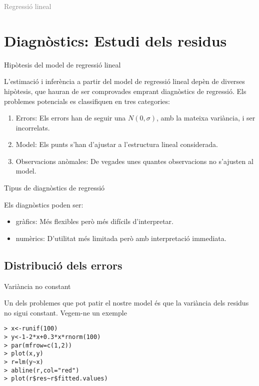 \documentclass[12pt,t]{beamer}
\title[\red{Matemàtiques III}]{}
\author[]{}
\date{}
\newcommand{\gray}[1]{\textcolor{gray}{#1}}
\renewcommand{\emph}[1]{{\color{red}#1}}
\theoremstyle{plain}
\theoremstyle{definition}
\begin{document}
\beamertemplatedotitem

\lstset{breaklines=true}
\lstset{basicstyle=\ttfamily}


\begin{frame}
\vfill
\begin{center}
\gray{\LARGE Regressió lineal}
\end{center}
\vfill
\end{frame}

\section{Diagnòstics: Estudi dels residus}

\begin{frame}{Hipòtesis del model de regressió lineal}

L'estimació i inferència a partir del model de regressió lineal depèn de diverses hipòtesis, que hauran de ser comprovades emprant \emph{diagnòstics de regressió}. Els problemes potencials es classifiquen en tres categories:
\pause
\begin{enumerate}
\item \emph{Errors}: Els errors han de seguir una $N(0,\sigma)$, amb la mateixa variància, i ser incorrelats.
\pause
\item \emph{Model}: Els punts s'han d'ajustar a l'estructura lineal considerada.
\pause
\item \emph{Observacions anòmales}: De vegades unes quantes observacions no s'ajusten al model.
\end{enumerate}

\end{frame}

\begin{frame}{Tipus de diagnòstics de regressió}

Els diagnòstics poden ser:
\begin{itemize}
\item \emph{gràfics}: Més flexibles però més difícils d'interpretar.
\item \emph{numèrics}: D'utilitat més limitada però amb interpretació immediata.
\end{itemize}

\end{frame}

\subsection{Distribució dels errors}
\begin{frame}[fragile]{Variància no constant}

Un dels problemes que pot patir el nostre model és que la variància dels residus no sigui constant. Vegem-ne un exemple

\begin{verbatim}
> x<-runif(100)
> y<-1-2*x+0.3*x*rnorm(100)
> par(mfrow=c(1,2))
> plot(x,y)
> r=lm(y~x)
> abline(r,col="red")
> plot(r$res~r$fitted.values)
\end{verbatim}

\end{frame}
\end{document}
